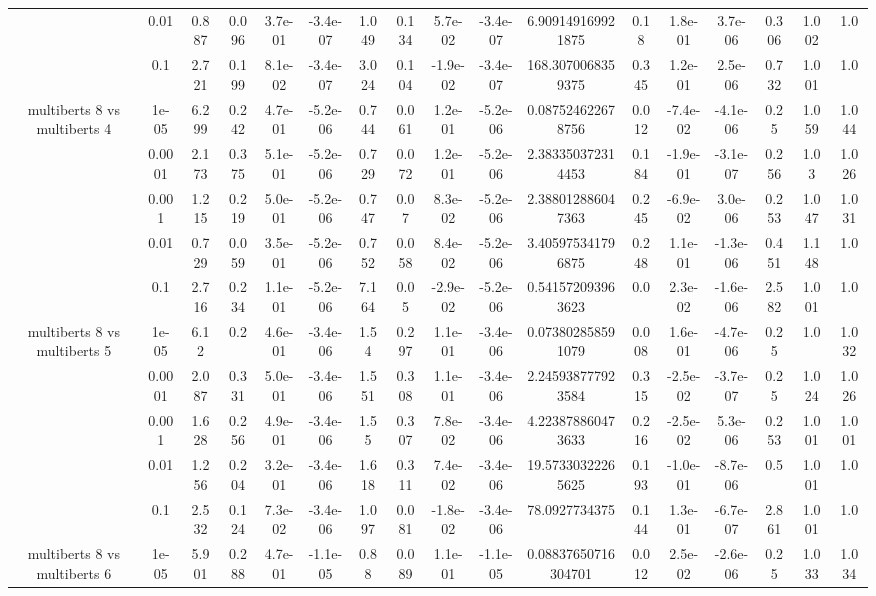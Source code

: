 \begin{tabular}{|c|c|c|c|c|c|c|c|c|c|c|c|c|c|c|c|c|}
 & 0.01 & 0.887 & 0.096 & 3.7e-01 & -3.4e-07 & 1.049 & 0.134 & 5.7e-02 & -3.4e-07 & 6.909149169921875 & 0.18 & 1.8e-01 & 3.7e-06 & 0.306 & 1.002 & 1.0 \\
 & 0.1 & 2.721 & 0.199 & 8.1e-02 & -3.4e-07 & 3.024 & 0.104 & -1.9e-02 & -3.4e-07 & 168.3070068359375 & 0.345 & 1.2e-01 & 2.5e-06 & 0.732 & 1.001 & 1.0 \\
\hline
\multirow{5}{*}{multiberts 8 vs multiberts 4} & 1e-05 & 6.299 & 0.242 & 4.7e-01 & -5.2e-06 & 0.744 & 0.061 & 1.2e-01 & -5.2e-06 & 0.087524622678756 & 0.012 & -7.4e-02 & -4.1e-06 & 0.25 & 1.059 & 1.044 \\
 & 0.0001 & 2.173 & 0.375 & 5.1e-01 & -5.2e-06 & 0.729 & 0.072 & 1.2e-01 & -5.2e-06 & 2.383350372314453 & 0.184 & -1.9e-01 & -3.1e-07 & 0.256 & 1.03 & 1.026 \\
 & 0.001 & 1.215 & 0.219 & 5.0e-01 & -5.2e-06 & 0.747 & 0.07 & 8.3e-02 & -5.2e-06 & 2.388012886047363 & 0.245 & -6.9e-02 & 3.0e-06 & 0.253 & 1.047 & 1.031 \\
 & 0.01 & 0.729 & 0.059 & 3.5e-01 & -5.2e-06 & 0.752 & 0.058 & 8.4e-02 & -5.2e-06 & 3.405975341796875 & 0.248 & 1.1e-01 & -1.3e-06 & 0.451 & 1.148 & 1.0 \\
 & 0.1 & 2.716 & 0.234 & 1.1e-01 & -5.2e-06 & 7.164 & 0.05 & -2.9e-02 & -5.2e-06 & 0.541572093963623 & 0.0 & 2.3e-02 & -1.6e-06 & 2.582 & 1.001 & 1.0 \\
\hline
\multirow{5}{*}{multiberts 8 vs multiberts 5} & 1e-05 & 6.12 & 0.2 & 4.6e-01 & -3.4e-06 & 1.54 & 0.297 & 1.1e-01 & -3.4e-06 & 0.073802858591079 & 0.008 & 1.6e-01 & -4.7e-06 & 0.25 & 1.0 & 1.032 \\
 & 0.0001 & 2.087 & 0.331 & 5.0e-01 & -3.4e-06 & 1.551 & 0.308 & 1.1e-01 & -3.4e-06 & 2.245938777923584 & 0.315 & -2.5e-02 & -3.7e-07 & 0.25 & 1.024 & 1.026 \\
 & 0.001 & 1.628 & 0.256 & 4.9e-01 & -3.4e-06 & 1.55 & 0.307 & 7.8e-02 & -3.4e-06 & 4.223878860473633 & 0.216 & -2.5e-02 & 5.3e-06 & 0.253 & 1.001 & 1.001 \\
 & 0.01 & 1.256 & 0.204 & 3.2e-01 & -3.4e-06 & 1.618 & 0.311 & 7.4e-02 & -3.4e-06 & 19.57330322265625 & 0.193 & -1.0e-01 & -8.7e-06 & 0.5 & 1.001 & 1.0 \\
 & 0.1 & 2.532 & 0.124 & 7.3e-02 & -3.4e-06 & 1.097 & 0.081 & -1.8e-02 & -3.4e-06 & 78.0927734375 & 0.144 & 1.3e-01 & -6.7e-07 & 2.861 & 1.001 & 1.0 \\
\hline
\multirow{5}{*}{multiberts 8 vs multiberts 6} & 1e-05 & 5.901 & 0.288 & 4.7e-01 & -1.1e-05 & 0.88 & 0.089 & 1.1e-01 & -1.1e-05 & 0.08837650716304701 & 0.012 & 2.5e-02 & -2.6e-06 & 0.25 & 1.033 & 1.034 \\

\end{tabular}
